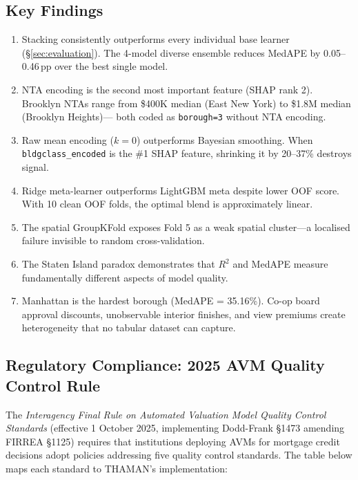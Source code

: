 \documentclass[11pt, a4paper, twoside]{article}
\begin{document}
\subsection{Key Findings}
\begin{enumerate}
  \item Stacking consistently outperforms every individual base learner (\S\ref{sec:evaluation}).
        The 4-model diverse ensemble reduces MedAPE by 0.05--0.46\,pp over the best
        single model.
  \item NTA encoding is the second most important feature (SHAP rank 2). Brooklyn NTAs
        range from \$400K median (East New York) to \$1.8M median (Brooklyn Heights)---
        both coded as \texttt{borough=3} without NTA encoding.
  \item Raw mean encoding ($k=0$) outperforms Bayesian smoothing. When
        \texttt{bldgclass\_encoded} is the \#1 SHAP feature, shrinking it by
        20--37\% destroys signal.
  \item Ridge meta-learner outperforms LightGBM meta despite lower OOF score.
        With 10 clean OOF folds, the optimal blend is approximately linear.
  \item The spatial GroupKFold exposes Fold 5 as a weak spatial cluster---a
        localised failure invisible to random cross-validation.
  \item The Staten Island paradox demonstrates that $R^2$ and MedAPE measure
        fundamentally different aspects of model quality.
  \item Manhattan is the hardest borough (MedAPE = 35.16\%). Co-op board approval
        discounts, unobservable interior finishes, and view premiums create
        heterogeneity that no tabular dataset can capture.
\end{enumerate}

\subsection{Regulatory Compliance: 2025 AVM Quality Control Rule}
\label{sec:regulatory}
The \textit{Interagency Final Rule on Automated Valuation Model Quality
Control Standards} \cite{avm_qc_rule2025} (effective 1 October 2025,
implementing Dodd-Frank \S 1473 amending FIRREA \S 1125) requires that
institutions deploying AVMs
for mortgage credit decisions adopt policies addressing five quality control
standards. The table below maps each standard to THAMAN's implementation:
\end{document}
